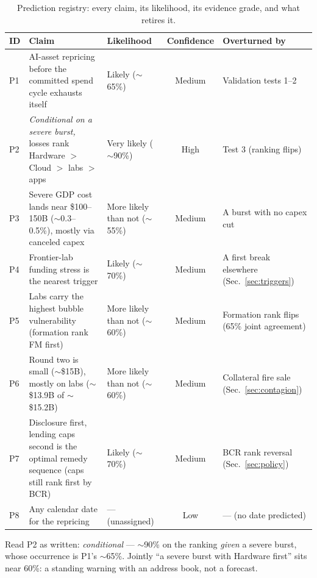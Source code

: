 \documentclass[11pt,a4paper]{article}
\begin{document}
\begin{table}[htbp]
\centering
\caption{Prediction registry: every claim, its likelihood, its evidence grade, and what retires it.}
\label{tab:registry}
\begin{tabular}{l>{\raggedright\arraybackslash}p{4.4cm}>{\raggedright\arraybackslash}p{2.7cm}c>{\raggedright\arraybackslash}p{3.0cm}}
\toprule
ID & Claim & Likelihood & Confidence & Overturned by \\
\midrule
P1 & AI-asset repricing before the committed spend cycle exhausts itself & Likely ($\sim$65\%) & Medium & Validation tests 1--2 \\
P2 & \emph{Conditional on a severe burst,} losses rank Hardware $>$ Cloud $>$ labs $>$ apps & Very likely ($\sim$90\%) & High & Test 3 (ranking flips) \\
P3 & Severe GDP cost lands near \$100--150B ($\sim$0.3--0.5\%), mostly via canceled capex & More likely than not ($\sim$55\%) & Medium & A burst with no capex cut \\
P4 & Frontier-lab funding stress is the nearest trigger & Likely ($\sim$70\%) & Medium & A first break elsewhere (Sec.~\ref{sec:triggers}) \\
P5 & Labs carry the highest bubble vulnerability (formation rank FM first) & More likely than not ($\sim$60\%) & Medium & Formation rank flips (65\% joint agreement) \\
P6 & Round two is small ($\sim$\$15B), mostly on labs ($\sim$\$13.9B of $\sim$\$15.2B) & More likely than not ($\sim$60\%) & Medium & Collateral fire sale (Sec.~\ref{sec:contagion}) \\
P7 & Disclosure first, lending caps second is the optimal remedy sequence (caps still rank first by BCR) & Likely ($\sim$70\%) & Medium & BCR rank reversal (Sec.~\ref{sec:policy}) \\
P8 & Any calendar date for the repricing & --- (unassigned) & Low & --- (no date predicted) \\
\bottomrule
\end{tabular}
\end{table}

Read P2 as written: \emph{conditional} --- $\sim$90\% on the ranking
\emph{given} a severe burst, whose occurrence is P1's $\sim$65\%. Jointly
``a severe burst with Hardware first'' sits near 60\%: a standing warning
with an address book, not a forecast.
\end{document}
